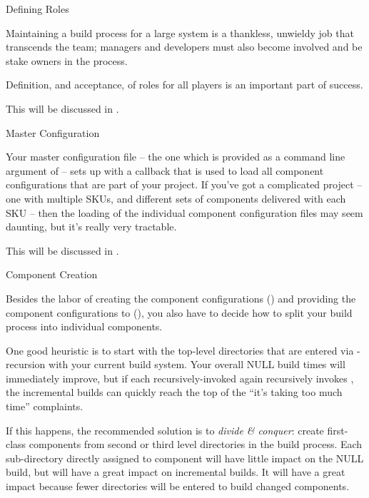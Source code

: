 \begin{description}
\item Defining Roles

  Maintaining a build process for a large system is a thankless,
  unwieldy job that transcends the \bni team; managers and developers
  must also become involved and be stake owners in the process.

  Definition, and acceptance, of roles for all players is an important
  part of success.

  This will be discussed in .

\item Master Configuration

  Your master configuration file -- the one which is provided as a
  command line argument of \lmsbw -- sets up \lmsbw with a callback
  that is used to load all component configurations that are part of
  your project.  If you've got a complicated project -- one with
  multiple SKUs, and different sets of components delivered with each
  SKU -- then the loading of the individual component configuration
  files may seem daunting, but it's really very tractable.

  This will be discussed in .

\item Component Creation


  Besides the labor of creating the component configurations
  () and providing the component
  configurations to \lmsbw (), you
  also have to decide how to split your build process into individual
  components.

  One good heuristic is to start with the top-level directories that
  are entered via \make-recursion with your current build system.
  Your overall NULL build times will immediately improve, but if each
  recursively-invoked \makefile again recursively invokes \make, the
  incremental builds can quickly reach the top of the ``it's taking
  too much time'' complaints.

  If this happens, the recommended solution is to \emph{divide \&
    conquer}: create first-class components from second or third level
  directories in the build process.  Each sub-directory directly
  assigned to component will have little impact on the NULL build, but
  will have a great impact on incremental builds.  It will have a
  great impact because fewer directories will be entered to build
  changed components.


\end{description}
